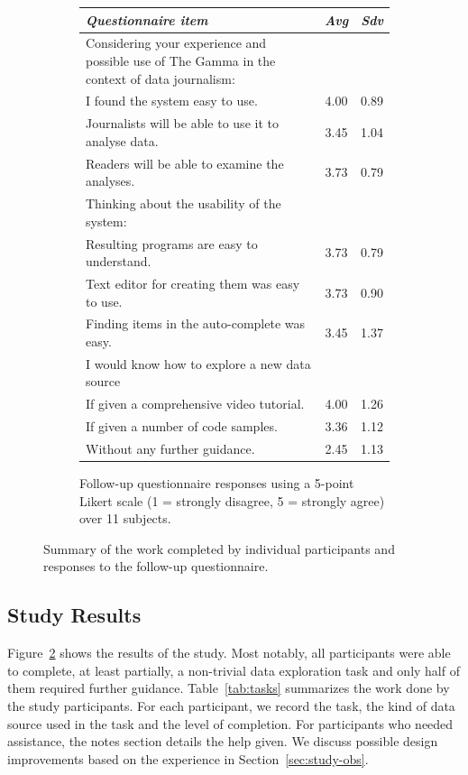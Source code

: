\documentclass[manuscript,review,anonymous]{acmart}
\begin{document}
\begin{figure}
  \hfill
  \begin{subfigure}[b]{0.49\textwidth}
    \centering
    \begin{tabular}{p{17.25em} c c}
      \toprule
        {\small \textit{Questionnaire item}} & {\small \textit{Avg}} & {\small \textit{Sdv}} \\
      \midrule
      \small Considering your experience and possible use of The Gamma in the context of data journalism:\\
      \small \quad I found the system easy to use. & \small 4.00 & \small 0.89\\
      \small \quad Journalists will be able to use it to analyse data. & \small 3.45 & \small 1.04\\
      \small \quad Readers will be able to examine the analyses. & \small 3.73 & \small 0.79\\
      \small Thinking about the usability of the system:\\
      \small \quad Resulting programs are easy to understand. & \small 3.73 & \small 0.79\\
      \small \quad Text editor for creating them was easy to use. & \small 3.73 & \small 0.90\\
      \small \quad Finding items in the auto-complete was easy. & \small 3.45 & \small 1.37\\
      \small I would know how to explore a new data source\\
      \small \quad If given a comprehensive video tutorial. & \small 4.00 & \small 1.26\\
      \small \quad If given a number of code samples. & \small 3.36 & \small 1.12\\
      \small \quad Without any further guidance. & \small 2.45 & \small 1.13 \vspace{0.1em}\\
      \bottomrule
    \end{tabular}
    \caption{Follow-up questionnaire responses using
      a 5-point Likert scale (1 = strongly disagree, 5 = strongly agree) over 11 subjects.}
    \label{tab:quest}
  \end{subfigure}
  \vspace{-0.5em}
  \caption{Summary of the work completed by individual participants and responses to the follow-up questionnaire.}
  \label{tab:tabs}
  \vspace{-0.25em}
\end{figure}

\subsection{Study Results}
Figure~\ref{tab:tabs} shows the results of the study. Most notably, all participants were able to
complete, at least partially, a non-trivial data exploration task and only half of them required
further guidance. Table~\ref{tab:tasks} summarizes the work done by the study participants.
For each participant, we record the task, the kind of data source used in the task and the
level of completion. For participants who needed assistance, the notes section details the help
given. We discuss possible design improvements based on the experience in Section~\ref{sec:study-obs}.
\end{document}
